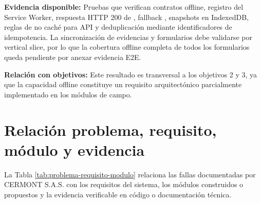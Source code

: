 \textbf{Evidencia disponible:} Pruebas que verifican contratos offline, registro del Service Worker, respuesta HTTP 200 de , fallback , snapshots en IndexedDB, reglas de no caché para API y deduplicación mediante identificadores de idempotencia. La sincronización de evidencias y formularios debe validarse por vertical slice, por lo que la cobertura offline completa de todos los formularios queda pendiente por anexar evidencia E2E.

\textbf{Relación con objetivos:} Este resultado es transversal a los objetivos 2 y 3, ya que la capacidad offline constituye un requisito arquitectónico parcialmente implementado en los módulos de campo.

\section{Relación problema, requisito, módulo y evidencia}
\label{sec:problema-requisito-modulo}

La Tabla \ref{tab:problema-requisito-modulo} relaciona las fallas documentadas por CERMONT S.A.S. con los requisitos del sistema, los módulos construidos o propuestos y la evidencia verificable en código o documentación técnica.

